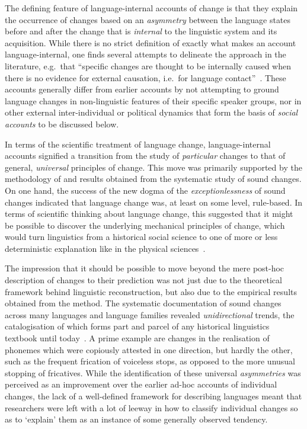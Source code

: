The defining feature of language-internal accounts of change is that they explain the occurrence of changes based on an \emph{asymmetry} between the language states before and after the change that is \emph{internal} to the linguistic system and its acquisition. %
While there is no strict definition of exactly what makes an account language-internal, one finds several attempts to delineate the approach in the literature, e.g.~that ``specific changes are thought to be internally caused when there is no evidence for external causation, i.e.~for language contact''~\citep[p.366]{Luraghi2010}.
These accounts generally differ from earlier accounts by not attempting to ground language changes in non-linguistic features of their specific speaker groups, nor in other external inter-individual or political dynamics that form the basis of \emph{social accounts} to be discussed below.

In terms of the scientific treatment of language change, language-internal accounts signified a transition from the study of \emph{particular} changes to that of general, \emph{universal} principles of change. This move was primarily supported by the methodology of and results obtained from the systematic study of sound changes. On one hand, the success of the new dogma of the \emph{exceptionlessness} of sound changes indicated that language change was, at least on some level, rule-based. In terms of scientific thinking about language change, this suggested that it might be possible to discover the underlying mechanical principles of change, which would turn linguistics from a historical social science to one of more or less deterministic explanation like in the physical sciences~\citep{Sapir1929}.

The impression that it should be possible to move beyond the mere post-hoc description of changes to their prediction was not just due to the theoretical framework behind linguistic reconstruction, but also due to the empirical results obtained from the method. The systematic documentation of sound changes across many languages and language families revealed \emph{unidirectional} trends, the catalogisation of which forms part and parcel of any historical linguistics textbook until today~\citep[see e.g.][]{Campbell2013}. A prime example are changes in the realisation of phonemes which were copiously attested in one direction, but hardly the other, such as the frequent frication of voiceless stops, as opposed to the more unusual stopping of fricatives. While the identification of these universal \emph{asymmetries} was perceived as an improvement over the earlier ad-hoc accounts of individual changes, the lack of a well-defined framework for describing languages meant that researchers were left with a lot of leeway in how to classify individual changes so as to `explain' them as an instance of some generally observed tendency.

